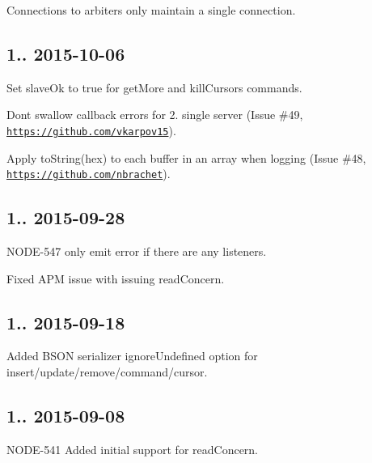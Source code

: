 \begin{DoxyItemize}
\item Connections to arbiters only maintain a single connection.
\end{DoxyItemize}

\subsection*{1.. 2015-\/10-\/06 }


\begin{DoxyItemize}
\item Set slave\+Ok to true for get\+More and kill\+Cursors commands.
\item Don\textquotesingle{}t swallow callback errors for 2. single server (Issue \#49, \href{https://github.com/vkarpov15}{\tt https\+://github.\+com/vkarpov15}).
\item Apply to\+String(\textquotesingle{}hex\textquotesingle{}) to each buffer in an array when logging (Issue \#48, \href{https://github.com/nbrachet}{\tt https\+://github.\+com/nbrachet}).
\end{DoxyItemize}

\subsection*{1.. 2015-\/09-\/28 }


\begin{DoxyItemize}
\item N\+O\+D\+E-\/547 only emit error if there are any listeners.
\item Fixed A\+PM issue with issuing read\+Concern.
\end{DoxyItemize}

\subsection*{1.. 2015-\/09-\/18 }


\begin{DoxyItemize}
\item Added B\+S\+ON serializer ignore\+Undefined option for insert/update/remove/command/cursor.
\end{DoxyItemize}

\subsection*{1.. 2015-\/09-\/08 }


\begin{DoxyItemize}
\item N\+O\+D\+E-\/541 Added initial support for read\+Concern.
\end{DoxyItemize}

